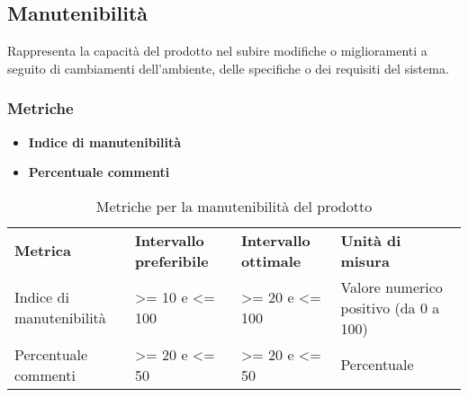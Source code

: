 \subsection{Manutenibilità}
Rappresenta la capacità del prodotto nel subire modifiche o miglioramenti a seguito di cambiamenti dell'ambiente, delle specifiche o dei requisiti del sistema.
\subsubsection{Metriche}
\begin{itemize}
	\item \textbf{Indice di manutenibilità}
	\item \textbf{Percentuale commenti}
\end{itemize}

\renewcommand{\arraystretch}{2.2}
\begin{longtable}{|C{3cm}|C{3cm}|C{3cm}|C{3cm}|}

	\caption{Metriche per la manutenibilità del prodotto}\\
	\hline

	\textbf{Metrica} & \textbf{Intervallo preferibile}  & \textbf{Intervallo ottimale} & \textbf{Unità di misura}
	\tabularnewline
	\endfirsthead

	Indice di manutenibilità &  >= 10 e <= 100 & >= 20 e <= 100 & Valore numerico positivo (da 0 a 100) \\
	Percentuale commenti &  >= 20 e <= 50 & >= 20 e <= 50 & Percentuale \\
\end{longtable}
